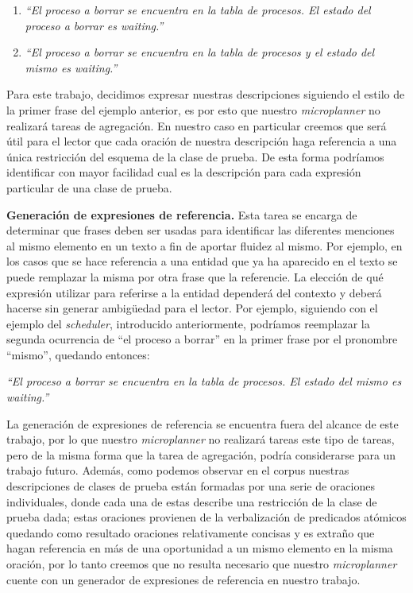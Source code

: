 \begin{center}
\begin{enumerate}
  \item \emph{``El proceso a borrar se encuentra en la tabla de procesos. El estado del proceso a borrar es waiting.''} 
  \item \emph{``El proceso a borrar se encuentra en la tabla de procesos y el estado del mismo es waiting.''}
\end{enumerate}
\end{center}

\medskip
\noindent
Para este trabajo, decidimos expresar nuestras descripciones siguiendo el estilo de la primer frase del ejemplo anterior, es por esto que nuestro \textit{microplanner} no realizará tareas de agregación. En nuestro caso en particular creemos que será útil para el lector que cada oración de nuestra descripción haga referencia a una única restricción del esquema de la clase de prueba. De esta forma podríamos identificar con mayor facilidad cual es la descripción para cada expresión particular de una clase de prueba.


\medskip
\noindent
\textbf{Generación de expresiones de referencia.} Esta tarea se encarga de determinar que frases deben ser usadas para identificar las diferentes menciones al mismo elemento en un texto a fin de aportar fluidez al mismo. Por ejemplo, en los casos que se hace referencia a una entidad que ya ha aparecido en el texto se puede remplazar la misma por otra frase que la referencie. La elección de qué expresión utilizar para referirse a la entidad dependerá del contexto y deberá hacerse sin generar ambigüedad para el lector. Por ejemplo, siguiendo con el ejemplo del \emph{scheduler}, introducido anteriormente, podríamos reemplazar la segunda ocurrencia de ``el proceso a borrar'' en la primer frase por el pronombre ``mismo'', quedando entonces:

\smallskip
\begin{center}
\emph{``El proceso a borrar se encuentra en la tabla de procesos. El estado del mismo es waiting.''} 
\end{center}

\smallskip
La generación de expresiones de referencia se encuentra fuera del alcance de este trabajo, por lo que nuestro \textit{microplanner} no realizará tareas este tipo de tareas, pero de la misma forma que la tarea de agregación, podría considerarse para un trabajo futuro. Además, como podemos observar en el corpus nuestras descripciones de clases de prueba están formadas por una serie de oraciones individuales, donde cada una de estas describe una restricción de la clase de prueba dada; estas oraciones provienen de la verbalización de predicados atómicos quedando como resultado oraciones relativamente concisas y es extraño que hagan referencia en más de una oportunidad a un mismo elemento en la misma oración, por lo tanto creemos que no resulta necesario que nuestro \textit{microplanner} cuente con un generador de expresiones de referencia en nuestro trabajo.

